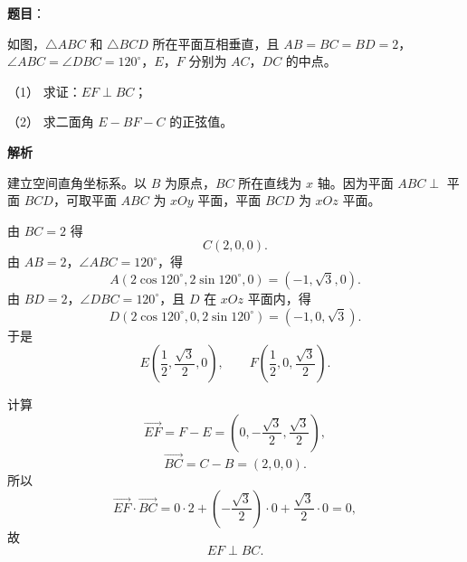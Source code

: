 \begin{answer}


\end{answer}
\begin{answer}

\textbf{题目}：

如图，$\triangle ABC$ 和 $\triangle BCD$ 所在平面互相垂直，且 $AB=BC=BD=2$，$\angle ABC=\angle DBC=120^\circ$，$E$，$F$ 分别为 $AC$，$DC$ 的中点。
\nopagebreak[4]
\begin{center}\end{center}
\nopagebreak[4]
（1） 求证：$EF\perp BC$；

（2） 求二面角 $E-BF-C$ 的正弦值。

\textbf{解析}

建立空间直角坐标系。以 $B$ 为原点，$BC$ 所在直线为 $x$ 轴。因为平面 $ABC\perp$ 平面 $BCD$，可取平面 $ABC$ 为 $xOy$ 平面，平面 $BCD$ 为 $xOz$ 平面。

由 $BC=2$ 得
\nopagebreak[4]
\[C(2,0,0).\]
由 $AB=2$，$\angle ABC=120^\circ$，得
\nopagebreak[4]
\[A(2\cos120^\circ,2\sin120^\circ,0)=(-1,\sqrt3,0).\]
由 $BD=2$，$\angle DBC=120^\circ$，且 $D$ 在 $xOz$ 平面内，得
\nopagebreak[4]
\[D(2\cos120^\circ,0,2\sin120^\circ)=(-1,0,\sqrt3).\]
于是
\nopagebreak[4]
\[E\left(\frac12,\frac{\sqrt3}2,0\right),\qquad
F\left(\frac12,0,\frac{\sqrt3}2\right).\]


计算
\nopagebreak[4]
\[\overrightarrow{EF}
=F-E=\left(0,-\frac{\sqrt3}2,\frac{\sqrt3}2\right),\]
\nopagebreak[4]
\[\overrightarrow{BC}=C-B=(2,0,0).\]
所以
\nopagebreak[4]
\[\overrightarrow{EF}\cdot\overrightarrow{BC}
=0\cdot2+\left(-\frac{\sqrt3}2\right)\cdot0+\frac{\sqrt3}2\cdot0=0,\]
故
\nopagebreak[4]
\[EF\perp BC.\]



\end{answer}
